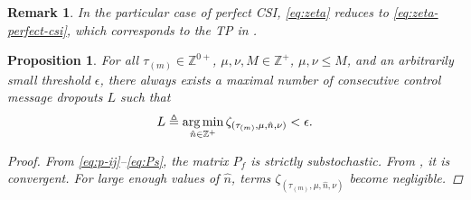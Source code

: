 \documentclass[letterpaper, 10 pt, conference]{ieeeconf}  %
\newtheorem{remark}{Remark}
\newtheorem{proposition}{Proposition}
\begin{document}
\begin{remark}\label{rem:automatica-1}
    In the particular case of perfect CSI, \eqref{eq:zeta} reduces to \eqref{eq:zeta-perfect-csi}, which corresponds to the TP in \cite[Eq. (19)]{yZL-2025-automatica}.
\end{remark}

\begin{proposition}\label{prop:L}
For all $\tau_{(m)} \in \mathbb{Z}^{0+}$,  $\mu,\nu,M \in\mathbb{Z}^{+}$, $\mu,\nu\leq M$, and an arbitrarily small threshold $\epsilon$, there always exists a  maximal number of consecutive control message dropouts $L$ such that
\begin{equation}\label{eq:L}
    \text{\small $L \triangleq \mathop{\mathrm{arg\,min}}_{\hat{n} \in \mathbb{Z}^{+}}
    \zeta_{(\tau_{(m)},\mu,\hat{n},\nu)}<\epsilon$}.
\end{equation}
\begin{proof}
From \eqref{eq:p-ij}--\eqref{eq:Ps}, the matrix $P_{f}$ is strictly substochastic.
From \cite[Th. 8.1.22 and 5.6.12]{horn2012matrix}, it is convergent. For large enough values of $\hat{n}$, terms $\zeta_{(\tau_{(m)},\mu,\hat{n},\nu)}$ become negligible. %
\end{proof}
\end{proposition}
\end{document}
